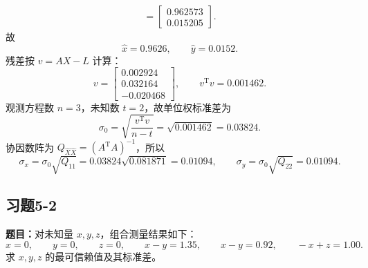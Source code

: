 \documentclass[UTF8,zihao=-4]{ctexart}
\newcommand{\problem}[1]{\subsection*{#1}}
\newcommand{\timu}{\noindent\textbf{题目：}}
\begin{document}
{\begin{equation*}
\begin{aligned}
    =\begin{bmatrix}0.962573\\0.015205\end{bmatrix}.
\end{aligned}
\end{equation*}
故
\begin{equation*}
    \hat{x}=0.9626,\qquad \hat{y}=0.0152.
\end{equation*}
残差按 $v=AX-L$ 计算：
\begin{equation*}
    v=\begin{bmatrix}0.002924\\0.032164\\-0.020468\end{bmatrix},\qquad
    v^{\mathrm T}v=0.001462.
\end{equation*}
观测方程数 $n=3$，未知数 $t=2$，故单位权标准差为
\begin{equation*}
    \sigma_0=\sqrt{\frac{v^{\mathrm T}v}{n-t}}
    =\sqrt{0.001462}=0.03824.
\end{equation*}
协因数阵为 $Q_{\hat X\hat X}=(A^{\mathrm T}A)^{-1}$，所以
\begin{equation*}
    \sigma_x=\sigma_0\sqrt{Q_{11}}=0.03824\sqrt{0.081871}=0.01094,
    \qquad
    \sigma_y=\sigma_0\sqrt{Q_{22}}=0.01094.
\end{equation*}

\problem{习题5-2}
\timu 对未知量 $x,y,z$，组合测量结果如下：
\begin{equation*}
    x=0,\qquad y=0,\qquad z=0,\qquad x-y=1.35,\qquad x-y=0.92,\qquad -x+z=1.00.
\end{equation*}
求 $x,y,z$ 的最可信赖值及其标准差。

}
\end{document}
